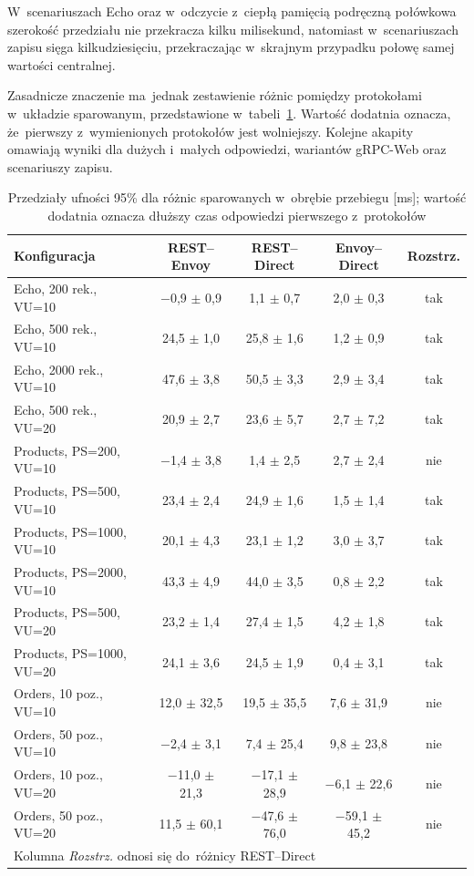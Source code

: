 W~scenariuszach Echo oraz w~odczycie z~ciepłą pamięcią podręczną połówkowa szerokość przedziału nie przekracza kilku milisekund, natomiast w~scenariuszach zapisu sięga kilkudziesięciu, przekraczając w~skrajnym przypadku połowę samej wartości centralnej.

Zasadnicze znaczenie ma~jednak zestawienie różnic pomiędzy protokołami w~układzie sparowanym, przedstawione w~tabeli~\ref{tab:PrzedzialyRoznic}. Wartość dodatnia oznacza, że~pierwszy z~wymienionych protokołów jest wolniejszy. Kolejne akapity omawiają wyniki dla dużych i~małych odpowiedzi, wariantów gRPC-Web oraz scenariuszy zapisu.

\begin{table}[htb]
\centering
\footnotesize
\caption{Przedziały ufności 95\% dla różnic sparowanych w~obrębie przebiegu [ms]; wartość dodatnia oznacza dłuższy czas odpowiedzi pierwszego z~protokołów}
\label{tab:PrzedzialyRoznic}
\begin{tabular}{|l|c|c|c|c|}
\hline
\textbf{Konfiguracja} & \textbf{REST--Envoy} & \textbf{REST--Direct} & \textbf{Envoy--Direct} & \textbf{Rozstrz.} \\
\hline
Echo, 200 rek., VU=10      & $-$0,9 $\pm$ 0,9 & 1,1 $\pm$ 0,7 & 2,0 $\pm$ 0,3 & tak \\
Echo, 500 rek., VU=10      & 24,5 $\pm$ 1,0 & 25,8 $\pm$ 1,6 & 1,2 $\pm$ 0,9 & tak \\
Echo, 2000 rek., VU=10     & 47,6 $\pm$ 3,8 & 50,5 $\pm$ 3,3 & 2,9 $\pm$ 3,4 & tak \\
Echo, 500 rek., VU=20      & 20,9 $\pm$ 2,7 & 23,6 $\pm$ 5,7 & 2,7 $\pm$ 7,2 & tak \\
\hline
Products, PS=200, VU=10    & $-$1,4 $\pm$ 3,8 & 1,4 $\pm$ 2,5 & 2,7 $\pm$ 2,4 & nie \\
Products, PS=500, VU=10    & 23,4 $\pm$ 2,4 & 24,9 $\pm$ 1,6 & 1,5 $\pm$ 1,4 & tak \\
Products, PS=1000, VU=10   & 20,1 $\pm$ 4,3 & 23,1 $\pm$ 1,2 & 3,0 $\pm$ 3,7 & tak \\
Products, PS=2000, VU=10   & 43,3 $\pm$ 4,9 & 44,0 $\pm$ 3,5 & 0,8 $\pm$ 2,2 & tak \\
Products, PS=500, VU=20    & 23,2 $\pm$ 1,4 & 27,4 $\pm$ 1,5 & 4,2 $\pm$ 1,8 & tak \\
Products, PS=1000, VU=20   & 24,1 $\pm$ 3,6 & 24,5 $\pm$ 1,9 & 0,4 $\pm$ 3,1 & tak \\
\hline
Orders, 10 poz., VU=10     & 12,0 $\pm$ 32,5 & 19,5 $\pm$ 35,5 & 7,6 $\pm$ 31,9 & nie \\
Orders, 50 poz., VU=10     & $-$2,4 $\pm$ 3,1 & 7,4 $\pm$ 25,4 & 9,8 $\pm$ 23,8 & nie \\
Orders, 10 poz., VU=20     & $-$11,0 $\pm$ 21,3 & $-$17,1 $\pm$ 28,9 & $-$6,1 $\pm$ 22,6 & nie \\
Orders, 50 poz., VU=20     & 11,5 $\pm$ 60,1 & $-$47,6 $\pm$ 76,0 & $-$59,1 $\pm$ 45,2 & nie \\
\hline
\multicolumn{5}{|l|}{\footnotesize Kolumna \textit{Rozstrz.} odnosi się do~różnicy REST--Direct} \\
\hline
\end{tabular}
\end{table}


